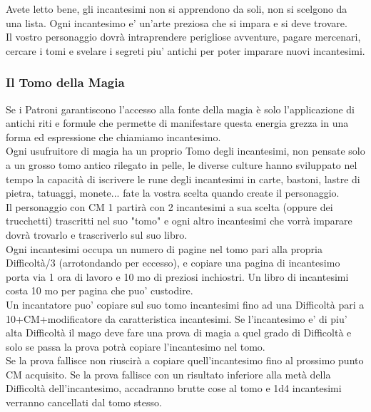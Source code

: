 \begin{multicols}{2}
\begin{note}
Avete letto bene, gli incantesimi non si apprendono da soli, non si scelgono da una lista. Ogni incantesimo e' un'arte preziosa che si impara e si deve trovare.\\
Il vostro personaggio dovrà intraprendere perigliose avventure, pagare mercenari, cercare i tomi e svelare i segreti piu' antichi per poter imparare nuovi incantesimi.
\end{note}

\subsubsection{Il Tomo della Magia}

Se i Patroni garantiscono l'accesso alla fonte della magia è solo l'applicazione di antichi riti e formule che permette di manifestare questa energia grezza in una forma ed espressione che chiamiamo incantesimo.\\
Ogni usufruitore di magia ha un proprio Tomo degli incantesimi, non pensate solo a un grosso tomo antico rilegato in pelle, le diverse culture hanno sviluppato nel tempo la capacità di iscrivere le rune degli incantesimi in carte, bastoni, lastre di pietra, tatuaggi, monete... fate la vostra scelta quando create il personaggio.\\

Il personaggio con CM 1 partirà con 2 incantesimi a sua scelta (oppure dei trucchetti) trascritti nel suo "tomo" e ogni altro incantesimi che vorrà imparare dovrà trovarlo e trascriverlo sul suo libro.\\

Ogni incantesimi occupa un numero di pagine nel tomo pari alla propria Difficoltà/3 (arrotondando per eccesso), e copiare una pagina di incantesimo porta via 1 ora di lavoro e 10 mo di preziosi inchiostri.
Un libro di incantesimi costa 10 mo per pagina che puo' custodire.\\
Un incantatore puo' copiare sul suo tomo incantesimi fino ad una Difficoltà pari a 10+CM+modificatore da caratteristica incantesimi. Se l'incantesimo e' di piu' alta Difficoltà il mago deve fare una prova di magia a quel grado di Difficoltà e solo se passa la prova potrà copiare l'incantesimo nel tomo.\\
Se la prova fallisce non riuscirà a copiare quell'incantesimo fino al prossimo punto CM acquisito. Se la prova fallisce con un risultato inferiore alla metà della Difficoltà dell'incantesimo, accadranno brutte cose al tomo e 1d4 incantesimi verranno cancellati dal tomo stesso.



\end{multicols}
